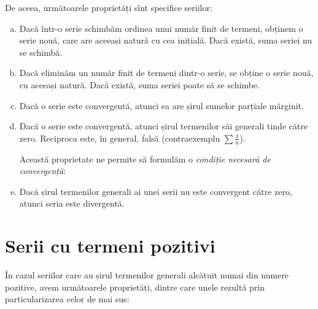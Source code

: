 De aceea, următoarele proprietăți sînt specifice seriilor:
\begin{enumerate}[(a)]
\item Dacă într-o serie schimbăm ordinea unui număr finit de termeni, obținem
  o serie nouă, care are aceeași natură cu cea inițială. Dacă există, suma seriei
  nu se schimbă.
\item Dacă eliminăm un număr finit de termeni dintr-o serie, se obține o
  serie nouă, cu aceeași natură. Dacă există, suma seriei poate să se schimbe.
\item Dacă o serie este convergentă, atunci ea are șirul sumelor parțiale mărginit.
\item Dacă o serie este convergentă, atunci șirul termenilor săi generali
  tinde către zero. Reciproca este, în general, falsă (contraexemplu $ \sum \frac{1}{n} $).

  Această proprietate ne permite să formulăm o \emph{condiție necesară de convergență}:
\item Dacă șirul termenilor generali ai unei serii nu este convergent către
  zero, atunci seria este divergentă.
\end{enumerate}


\section{Serii cu termeni pozitivi}

În cazul seriilor care au șirul termenilor generali alcătuit numai
din numere pozitive, avem următoarele proprietăți, dintre care
unele rezultă prin particularizarea celor de mai sus:

